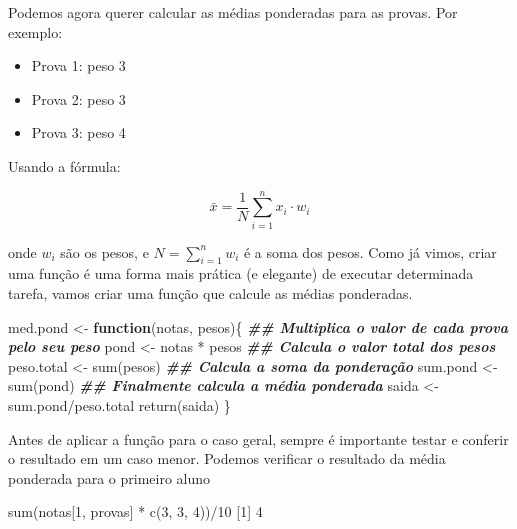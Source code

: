 \documentclass[
  10pt,
  a4paper]{book}
\newenvironment{Shaded}{\begin{snugshade}}{\end{snugshade}}
\newcommand{\ControlFlowTok}[1]{\textcolor[rgb]{0.13,0.29,0.53}{\textbf{#1}}}
\newcommand{\DecValTok}[1]{\textcolor[rgb]{0.00,0.00,0.81}{#1}}
\newcommand{\DocumentationTok}[1]{\textcolor[rgb]{0.56,0.35,0.01}{\textbf{\textit{#1}}}}
\newcommand{\FunctionTok}[1]{\textcolor[rgb]{0.00,0.00,0.00}{#1}}
\newcommand{\NormalTok}[1]{#1}
\newcommand{\OtherTok}[1]{\textcolor[rgb]{0.56,0.35,0.01}{#1}}
\newcommand{\SpecialCharTok}[1]{\textcolor[rgb]{0.00,0.00,0.00}{#1}}
\providecommand{\tightlist}{%
  \setlength{\itemsep}{0pt}\setlength{\parskip}{0pt}}
\begin{document}
Podemos agora querer calcular as médias ponderadas para as provas. Por
exemplo:

\begin{itemize}
\tightlist
\item
  Prova 1: peso 3
\item
  Prova 2: peso 3
\item
  Prova 3: peso 4
\end{itemize}

Usando a fórmula:

\[
\bar{x} = \frac{1}{N} \sum_{i=1}^{n} x_i \cdot w_i
\]

onde \(w_i\) são os pesos, e \(N = \sum_{i=1}^{n} w_i\) é a soma dos pesos.
Como já vimos, criar uma função é uma forma mais prática (e elegante)
de executar determinada tarefa, vamos criar uma função que calcule as
médias ponderadas.

\begin{Shaded}
\begin{Highlighting}[]
\NormalTok{med.pond }\OtherTok{\textless{}{-}} \ControlFlowTok{function}\NormalTok{(notas, pesos)\{}
    \DocumentationTok{\#\# Multiplica o valor de cada prova pelo seu peso}
\NormalTok{    pond }\OtherTok{\textless{}{-}}\NormalTok{ notas }\SpecialCharTok{*}\NormalTok{ pesos}
    \DocumentationTok{\#\# Calcula o valor total dos pesos}
\NormalTok{    peso.total }\OtherTok{\textless{}{-}} \FunctionTok{sum}\NormalTok{(pesos)}
    \DocumentationTok{\#\# Calcula a soma da ponderação}
\NormalTok{    sum.pond }\OtherTok{\textless{}{-}} \FunctionTok{sum}\NormalTok{(pond)}
    \DocumentationTok{\#\# Finalmente calcula a média ponderada}
\NormalTok{    saida }\OtherTok{\textless{}{-}}\NormalTok{ sum.pond}\SpecialCharTok{/}\NormalTok{peso.total}
    \FunctionTok{return}\NormalTok{(saida)}
\NormalTok{\}}
\end{Highlighting}
\end{Shaded}

Antes de aplicar a função para o caso geral, sempre é importante testar
e conferir o resultado em um caso menor. Podemos verificar o resultado
da média ponderada para o primeiro aluno

\begin{Shaded}
\begin{Highlighting}[]
\FunctionTok{sum}\NormalTok{(notas[}\DecValTok{1}\NormalTok{, provas] }\SpecialCharTok{*} \FunctionTok{c}\NormalTok{(}\DecValTok{3}\NormalTok{, }\DecValTok{3}\NormalTok{, }\DecValTok{4}\NormalTok{))}\SpecialCharTok{/}\DecValTok{10}
\NormalTok{[}\DecValTok{1}\NormalTok{] }\DecValTok{4}
\end{Highlighting}
\end{Shaded}
\end{document}
